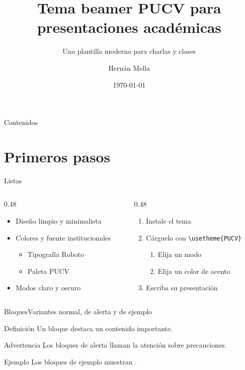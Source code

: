 \documentclass[11pt,aspectratio=\proporcion,xcolor=table]{beamer}
\title{Tema beamer PUCV para presentaciones académicas}
\subtitle{Una plantilla moderna para charlas y clases}
\author[H.~Mella]{Hernán Mella}
\institute{Escuela de Ingeniería Eléctrica\\
  Pontificia Universidad Católica de Valparaíso}
\date{\today}
\begin{document}
\maketitle

\begin{frame}{Contenidos}
  \tableofcontents
\end{frame}

\section{Primeros pasos}

\begin{frame}{Listas}
  \begin{columns}[T]
    \begin{column}{0.48\textwidth}
      \begin{itemize}
        \item Diseño limpio y minimalista
        \item Colores y fuente institucionales
          \begin{itemize}
            \item Tipografía Roboto
            \item Paleta PUCV
          \end{itemize}
        \item Modos claro y oscuro
      \end{itemize}
    \end{column}
    \begin{column}{0.48\textwidth}
      \begin{enumerate}
        \item Instale el tema
        \item Cárguelo con \texttt{\textbackslash usetheme\{PUCV\}}
          \begin{enumerate}
            \item Elija un modo
            \item Elija un color de acento
          \end{enumerate}
        \item Escriba su presentación
      \end{enumerate}
    \end{column}
  \end{columns}
\end{frame}

\begin{frame}{Bloques}{Variantes normal, de alerta y de ejemplo}
  \begin{block}{Definición}
    Un \alert{bloque} destaca un contenido importante.
  \end{block}
  \begin{alertblock}{Advertencia}
    Los bloques de alerta llaman la atención sobre precauciones.
  \end{alertblock}
  \begin{exampleblock}{Ejemplo}
    Los bloques de ejemplo muestran .
  \end{exampleblock}
\end{frame}
\end{document}
